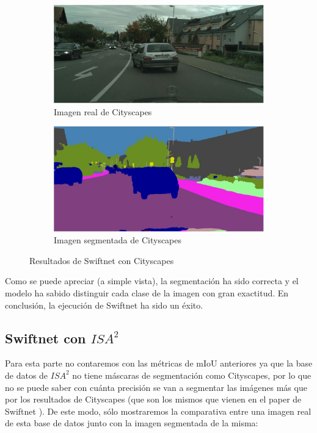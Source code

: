 \begin{figure}[H]
\centering
  \begin{subfigure}[b]{0.45\linewidth}
    \includegraphics[width=\linewidth]{Figuras/Imagen_Cityscapes_Real.eps}
    \caption{Imagen real de Cityscapes}
  \end{subfigure}
    \begin{subfigure}[b]{0.45\linewidth}
    \includegraphics[width=\linewidth]{Figuras/Imagen_Cityscapes_Segmentada.eps}
    \caption{Imagen segmentada de Cityscapes}
  \end{subfigure}
  \caption{Resultados de Swiftnet con Cityscapes}
\end{figure}

Como se puede apreciar (a simple vista), la segmentación ha sido correcta y el modelo ha sabido distinguir cada clase de la imagen con gran exactitud. En conclusión, la ejecución de Swiftnet ha sido un éxito.

\subsection{Swiftnet con $ISA^{2}$}

Para esta parte no contaremos con las métricas de \ac{mIoU} anteriores ya que la base de datos de $ISA^{2}$ no tiene máscaras de segmentación como Cityscapes, por lo que no se puede saber con cuánta precisión se van a segmentar las imágenes más que por los resultados de Cityscapes (que son los mismos que vienen en el paper de Swiftnet \cite{swiftnet}). De este modo, sólo mostraremos la comparativa entre una imagen real de esta base de datos junto con la imagen segmentada de la misma:

